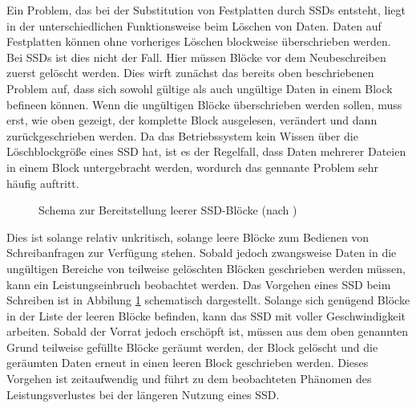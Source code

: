 Ein Problem, das bei der Substitution von Festplatten durch \acp{SSD} entsteht, liegt in der unterschiedlichen Funktionsweise beim Löschen von Daten. Daten auf
Festplatten können ohne vorheriges Löschen blockweise überschrieben werden. Bei \acp{SSD} ist dies nicht der Fall. Hier müssen Blöcke vor dem Neubeschreiben
zuerst gelöscht werden. Dies wirft zunächst das bereits oben beschriebenen Problem auf, dass sich sowohl gültige als auch ungültige Daten in einem Block befineen
können. Wenn die ungültigen Blöcke überschrieben werden sollen, muss erst, wie oben gezeigt, der komplette Block ausgelesen, verändert und dann zurückgeschrieben
werden. Da das Betriebssystem kein Wissen über die Löschblockgröße eines \ac{SSD} hat, ist es der Regelfall, dass Daten mehrerer Dateien in einem Block
untergebracht werden, wordurch das gennante Problem sehr häufig auftritt.

\begin{figure}[b!]\centering
	\caption[Schema zur Bereitstellung leerer SSD-Blöcke]{Schema zur Bereitstellung leerer SSD-Blöcke (nach \textcite{anand2})}
	\label{img:ssd3}
\end{figure}

Dies ist solange relativ unkritisch, solange leere Blöcke zum Bedienen von Schreibanfragen zur Verfügung stehen. Sobald jedoch zwangsweise Daten in die
ungültigen Bereiche von teilweise gelöschten Blöcken geschrieben werden müssen, kann ein Leistungseinbruch beobachtet werden. Das Vorgehen eines \ac{SSD} beim
Schreiben ist in Abbilung \ref{img:ssd3} schematisch dargestellt. Solange sich genügend Blöcke in der Liste der leeren Blöcke befinden, kann das \ac{SSD} mit
voller Geschwindigkeit arbeiten. Sobald der Vorrat jedoch erschöpft ist, müssen aus dem oben genannten Grund teilweise gefüllte Blöcke geräumt werden, der Block
gelöscht und die geräumten Daten erneut in einen leeren Block geschrieben werden. Dieses Vorgehen ist zeitaufwendig und führt zu dem beobachteten Phänomen des
Leistungsverlustes bei der längeren Nutzung eines \ac{SSD}.

